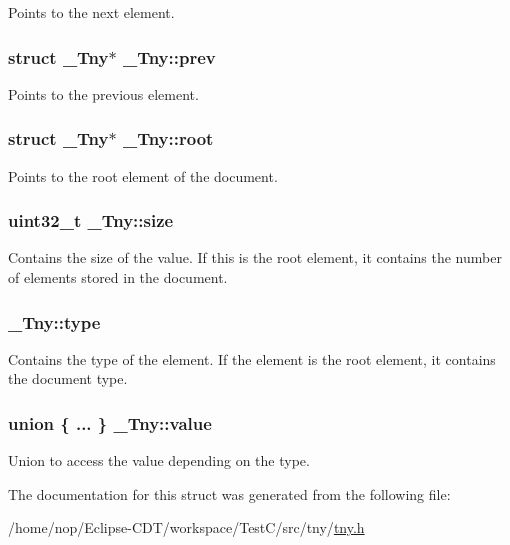 \-Points to the next element. \hypertarget{struct__Tny_a8d5f8f0948bf771c7cafa595e8573674}{
\subsubsection[{prev}]{\setlength{\rightskip}{0pt plus 5cm}struct {\bf \-\_\-\-Tny}$\ast$ {\bf \-\_\-\-Tny\-::prev}}}\label{struct__Tny_a8d5f8f0948bf771c7cafa595e8573674}
\-Points to the previous element. \hypertarget{struct__Tny_acb94256d861006db4e789a8a8733a48c}{
\subsubsection[{root}]{\setlength{\rightskip}{0pt plus 5cm}struct {\bf \-\_\-\-Tny}$\ast$ {\bf \-\_\-\-Tny\-::root}}}\label{struct__Tny_acb94256d861006db4e789a8a8733a48c}
\-Points to the root element of the document. \hypertarget{struct__Tny_a3e01f2bff5e3d773b3a09d00a229498f}{
\subsubsection[{size}]{\setlength{\rightskip}{0pt plus 5cm}uint32\-\_\-t {\bf \-\_\-\-Tny\-::size}}}\label{struct__Tny_a3e01f2bff5e3d773b3a09d00a229498f}
\-Contains the size of the value. \-If this is the root element, it contains the number of elements stored in the document. \hypertarget{struct__Tny_aecebe7f325021541ee357eb7ca5f2de7}{
\subsubsection[{type}]{ {\bf \-\_\-\-Tny\-::type}}}\label{struct__Tny_aecebe7f325021541ee357eb7ca5f2de7}
\-Contains the type of the element. \-If the element is the root element, it contains the document type. \hypertarget{struct__Tny_a832c5c7cfd9f65289a589dd97bbd02f6}{
\subsubsection[{value}]{\setlength{\rightskip}{0pt plus 5cm}union \{ ... \}   {\bf \-\_\-\-Tny\-::value}}}\label{struct__Tny_a832c5c7cfd9f65289a589dd97bbd02f6}
\-Union to access the value depending on the type. 

\-The documentation for this struct was generated from the following file\-:\begin{DoxyCompactItemize}
\item 
/home/nop/\-Eclipse-\/\-C\-D\-T/workspace/\-Test\-C/src/tny/\hyperlink{tny_8h}{tny.\-h}\end{DoxyCompactItemize}
